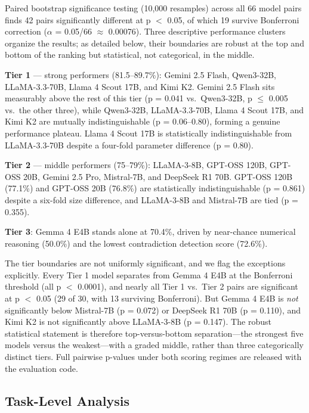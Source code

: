 \documentclass[11pt]{article}
\begin{document}
Paired bootstrap significance testing (10,000 resamples) across all 66 model pairs finds 42 pairs significantly different at p $<$ 0.05, of which 19 survive Bonferroni correction ($\alpha$ = 0.05/66 $\approx$ 0.00076). Three descriptive performance clusters organize the results; as detailed below, their boundaries are robust at the top and bottom of the ranking but statistical, not categorical, in the middle.

\textbf{Tier 1} --- strong performers (81.5--89.7\%): Gemini 2.5 Flash, Qwen3-32B, LLaMA-3.3-70B, Llama 4 Scout 17B, and Kimi K2. Gemini 2.5 Flash sits measurably above the rest of this tier (p = 0.041 vs.\ Qwen3-32B, p $\leq$ 0.005 vs.\ the other three), while Qwen3-32B, LLaMA-3.3-70B, Llama 4 Scout 17B, and Kimi K2 are mutually indistinguishable (p = 0.06--0.80), forming a genuine performance plateau. Llama 4 Scout 17B is statistically indistinguishable from LLaMA-3.3-70B despite a four-fold parameter difference (p = 0.80).

\textbf{Tier 2} --- middle performers (75--79\%): LLaMA-3-8B, GPT-OSS 120B, GPT-OSS 20B, Gemini 2.5 Pro, Mistral-7B, and DeepSeek R1 70B. GPT-OSS 120B (77.1\%) and GPT-OSS 20B (76.8\%) are statistically indistinguishable (p = 0.861) despite a six-fold size difference, and LLaMA-3-8B and Mistral-7B are tied (p = 0.355).

\textbf{Tier 3}: Gemma 4 E4B stands alone at 70.4\%, driven by near-chance numerical reasoning (50.0\%) and the lowest contradiction detection score (72.6\%).

The tier boundaries are not uniformly significant, and we flag the exceptions explicitly. Every Tier 1 model separates from Gemma 4 E4B at the Bonferroni threshold (all p $<$ 0.0001), and nearly all Tier 1 vs.\ Tier 2 pairs are significant at p $<$ 0.05 (29 of 30, with 13 surviving Bonferroni). But Gemma 4 E4B is \emph{not} significantly below Mistral-7B (p = 0.072) or DeepSeek R1 70B (p = 0.110), and Kimi K2 is not significantly above LLaMA-3-8B (p = 0.147). The robust statistical statement is therefore top-versus-bottom separation---the strongest five models versus the weakest---with a graded middle, rather than three categorically distinct tiers. Full pairwise p-values under both scoring regimes are released with the evaluation code.

\subsection{Task-Level Analysis}
\label{sec:tasklevel}
\end{document}
